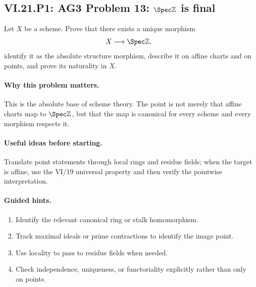 \subsection*{VI.21.P1: AG3 Problem 13: $\Spec\mathbb Z$ is final}
\begin{problem}\label{prob:vi21-p01}
Let $X$ be a scheme.  Prove that there exists a unique morphism
\[
X\longrightarrow\Spec\mathbb Z,
\]
identify it as the absolute structure morphism, describe it on affine charts and on points, and prove its naturality in $X$.
\end{problem}

\ifdefined\FullProblemDossiers
\paragraph{Why this problem matters.}
This is the absolute base of scheme theory.  The point is not merely that affine charts map to $\Spec\mathbb Z$, but that the map is canonical for every scheme and every morphism respects it.

\paragraph{Useful ideas before starting.}
Translate point statements through local rings and residue fields; when the target is affine, use the VI/19 universal property and then verify the pointwise interpretation.

\paragraph{Guided hints.}
\begin{enumerate}
\item Identify the relevant canonical ring or stalk homomorphism.
\item Track maximal ideals or prime contractions to identify the image point.
\item Use locality to pass to residue fields when needed.
\item Check independence, uniqueness, or functoriality explicitly rather than only on points.
\end{enumerate}

